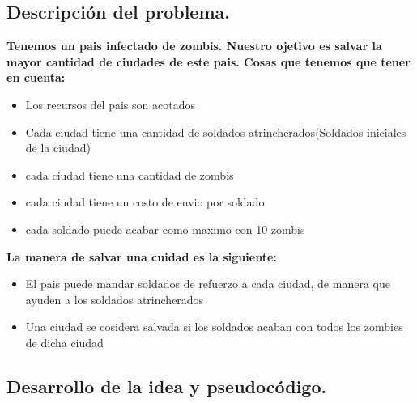 \subsection{Descripción del problema.}

\vspace*{0.3cm}

\textbf{
Tenemos un pais infectado de zombis. Nuestro ojetivo es salvar la mayor cantidad de ciudades de este pais.
Cosas que tenemos que tener en cuenta:
}
\begin{itemize}
   \item Los recursos del pais son acotados 
   \item Cada ciudad tiene una cantidad de soldados atrincherados(Soldados iniciales de la ciudad)  
   \item cada ciudad tiene una cantidad de zombis  
   \item cada ciudad tiene un costo de envio por soldado
   \item cada soldado puede acabar como maximo con 10 zombis 
\end{itemize}

\textbf{
La manera de salvar una cuidad es la siguiente:
}         
\begin{itemize}
	\item El pais puede mandar soldados de refuerzo a cada ciudad, de manera que ayuden a los soldados atrincherados
	\item Una ciudad se cosidera salvada si los soldados acaban con todos los zombies de dicha ciudad
\end{itemize}





\newpage
\subsection{Desarrollo de la idea y pseudocódigo.}

\vspace*{0.3cm}


